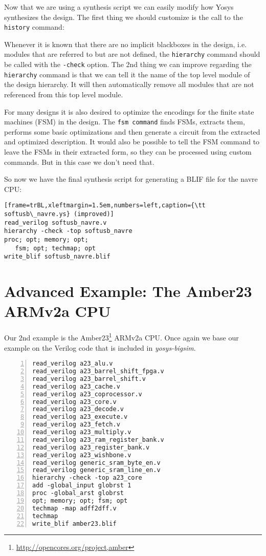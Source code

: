 \medskip

Now that we are using a synthesis script we can easily modify how Yosys
synthesizes the design. The first thing we should customize is the
call to the {\tt history} command:

Whenever it is known that there are no implicit blackboxes in the design, i.e.
modules that are referred to but are not defined, the {\tt hierarchy} command
should be called with the {\tt -check} option. The 2nd thing we can improve
regarding the {\tt hierarchy} command is that we can tell it the name of the
top level module of the design hierarchy. It will then automatically remove
all modules that are not referenced from this top level module.

\medskip

For many designs it is also desired to optimize the encodings for the finite
state machines (FSM) in the design. The {\tt fsm command} finds FSMs, extracts
them, performs some basic optimizations and then generate a circuit from
the extracted and optimized description. It would also be possible to tell
the FSM command to leave the FSMs in their extracted form, so they can be
processed using custom commands. But in this case we don't need that.

\medskip

So now we have the final synthesis script for generating a BLIF file
for the navre CPU:

\begin{lstlisting}[frame=trBL,xleftmargin=1.5em,numbers=left,caption={\tt softusb\_navre.ys} (improved)]
read_verilog softusb_navre.v
hierarchy -check -top softusb_navre
proc; opt; memory; opt;
   fsm; opt; techmap; opt
write_blif softusb_navre.blif
\end{lstlisting}

\section{Advanced Example: The Amber23 ARMv2a CPU}

Our 2nd example is the Amber23\footnote{\url{http://opencores.org/project,amber}}
ARMv2a CPU. Once again we base our example on the Verilog code that is included
in {\it yosys-bigsim}.

\begin{lstlisting}[frame=trBL,xleftmargin=1.5em,numbers=left,caption={\tt amber23.ys}]
read_verilog a23_alu.v
read_verilog a23_barrel_shift_fpga.v
read_verilog a23_barrel_shift.v
read_verilog a23_cache.v
read_verilog a23_coprocessor.v
read_verilog a23_core.v
read_verilog a23_decode.v
read_verilog a23_execute.v
read_verilog a23_fetch.v
read_verilog a23_multiply.v
read_verilog a23_ram_register_bank.v
read_verilog a23_register_bank.v
read_verilog a23_wishbone.v
read_verilog generic_sram_byte_en.v
read_verilog generic_sram_line_en.v
hierarchy -check -top a23_core
add -global_input globrst 1
proc -global_arst globrst
opt; memory; opt; fsm; opt
techmap -map adff2dff.v
techmap
write_blif amber23.blif
\end{lstlisting}


